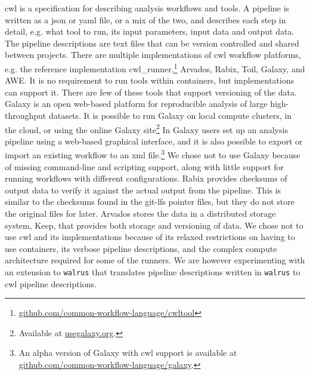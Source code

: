 \gls{cwl} is a specification for describing analysis workflows and
tools.\cite{commonwl} A pipeline is written as a \gls{json} or \gls{yaml} file,
or a mix of the two, and describes each step in detail, e.g. what tool to run,
its input parameters, input data and output data. The pipeline descriptions are
text files that can be version controlled and shared between projects. There are
multiple implementations of \gls{cwl} workflow platforms, e.g. the reference
implementation
cwl\_runner,\footnote{\url{github.com/common-workflow-language/cwltool}}
Arvados,\cite{arvados} Rabix,\cite{rabix} Toil,\cite{toil}
Galaxy,\cite{goecks2010galaxy}
and AWE.\cite{awe} It is no requirement to run tools within containers, but
implementations can support it. There are few of these tools that support
versioning of the data. 
Galaxy is an
open web-based platform for reproducible analysis of large high-throughput
datasets.\cite{goecks2010galaxy} It is possible to run Galaxy on local compute
clusters, in the cloud, or using the online Galaxy site\footnote{Available at
\url{usegalaxy.org}.} In Galaxy users set up an analysis pipeline using a
web-based graphical interface, and it is also possible to export or import an
existing workflow to an \gls{xml} file.\footnote{An alpha version of Galaxy with
\gls{cwl} support is available at
\url{github.com/common-workflow-language/galaxy}.}  We chose not to use Galaxy
because of missing command-line and scripting support, along with little support
for running workflows with different configurations.\cite{spjuth2015experiences}
Rabix provides checksums of output data to verify it
against the actual output from the pipeline. This is similar to the checksums
found in the git-lfs pointer files, but they do not store the original files for
later. Arvados stores the data in a distributed storage system, Keep, that
provides both storage and versioning of data. We chose not to use \gls{cwl} and
its implementations because of its relaxed restrictions on having to use
containers, its verbose pipeline descriptions, and the complex compute
architecture required for some of the runners. We are however experimenting
with an extension to \texttt{walrus} that translates pipeline descriptions
written in \texttt{walrus} to \gls{cwl} pipeline descriptions. 


